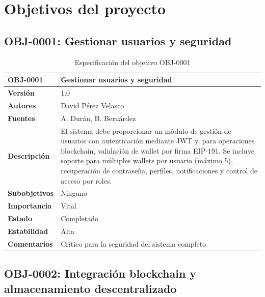 \documentclass[11pt, a4paper]{article}
\begin{document}
\section{Objetivos del proyecto}

\subsection{OBJ-0001: Gestionar usuarios y seguridad}

\begin{table}[H]
    \centering
    \small
    \begin{tabular}{|p{4cm}|p{10cm}|}
    \hline
    \textbf{OBJ-0001} & Gestionar usuarios y seguridad \\
    \hline
    \textbf{Versión} & 1.0 \\
    \hline
    \textbf{Autores} & David Pérez Velasco \\
    \hline
    \textbf{Fuentes} & A. Durán, B. Bernárdez \\
    \hline
    \textbf{Descripción} & El sistema debe proporcionar un módulo de gestión de usuarios con autenticación mediante JWT y, para operaciones blockchain, validación de wallet por firma EIP-191. Se incluye soporte para múltiples wallets por usuario (máximo 5), recuperación de contraseña, perfiles, notificaciones y control de acceso por roles. \\
    \hline
    \textbf{Subobjetivos} & Ninguno \\
    \hline
    \textbf{Importancia} & Vital \\
    \hline
    \textbf{Estado} & Completado \\
    \hline
    \textbf{Estabilidad} & Alta \\
    \hline
    \textbf{Comentarios} & Crítico para la seguridad del sistema completo \\
    \hline
    \end{tabular}
    \caption{Especificación del objetivo OBJ-0001}
\end{table}

\subsection{OBJ-0002: Integración blockchain y almacenamiento descentralizado}
\end{document}
